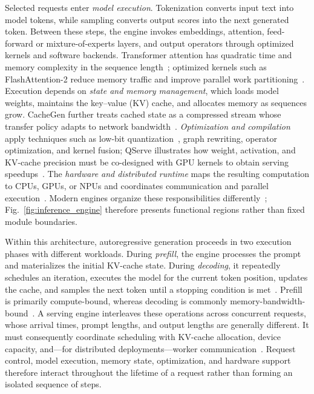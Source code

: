 Selected requests enter \emph{model execution}. Tokenization converts input text into model tokens, while sampling converts output scores into the next generated token. Between these steps, the engine invokes embeddings, attention, feed-forward or mixture-of-experts layers, and output operators through optimized kernels and software backends. Transformer attention has quadratic time and memory complexity in the sequence length~\cite{vaswani2017attention}; optimized kernels such as FlashAttention-2 reduce memory traffic and improve parallel work partitioning~\cite{dao2024flashattention2}. Execution depends on \emph{state and memory management}, which loads model weights, maintains the key--value (KV) cache, and allocates memory as sequences grow. CacheGen further treats cached state as a compressed stream whose transfer policy adapts to network bandwidth~\cite{liu2024cachegen}. \emph{Optimization and compilation} apply techniques such as low-bit quantization~\cite{lin2024awq}, graph rewriting, operator optimization, and kernel fusion; QServe illustrates how weight, activation, and KV-cache precision must be co-designed with GPU kernels to obtain serving speedups~\cite{lin2025qserve}. The \emph{hardware and distributed runtime} maps the resulting computation to CPUs, GPUs, or NPUs and coordinates communication and parallel execution~\cite{aminabadi2022deepspeed}. Modern engines organize these responsibilities differently~\cite{kwon2023pagedattention,zheng2024sglang,zhong2024distserve,pope2023scaling,park2026inferenceengines}; Fig.~\ref{fig:inference_engine} therefore presents functional regions rather than fixed module boundaries.

Within this architecture, autoregressive generation proceeds in two execution phases with different workloads. During \emph{prefill}, the engine processes the prompt and materializes the initial KV-cache state. During \emph{decoding}, it repeatedly schedules an iteration, executes the model for the current token position, updates the cache, and samples the next token until a stopping condition is met~\cite{vaswani2017attention}. Prefill is primarily compute-bound, whereas decoding is commonly memory-bandwidth-bound~\cite{patel2024splitwise,lin2024awq}. A serving engine interleaves these operations across concurrent requests, whose arrival times, prompt lengths, and output lengths are generally different. It must consequently coordinate scheduling with KV-cache allocation, device capacity, and---for distributed deployments---worker communication~\cite{yu2022orca,kwon2023pagedattention,agrawal2024sarathi,zhong2024distserve}. Request control, model execution, memory state, optimization, and hardware support therefore interact throughout the lifetime of a request rather than forming an isolated sequence of steps.

